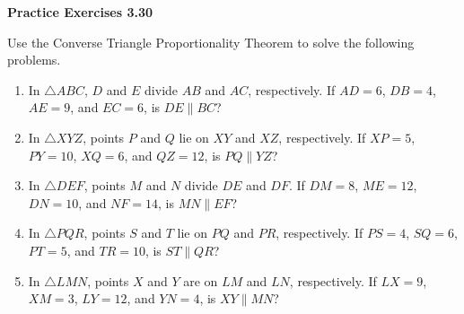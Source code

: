\vspace{0.3ex}
\noindent\textbf{Practice Exercises 3.30}

\vspace{0.2ex}

Use the Converse Triangle Proportionality Theorem to solve the following problems.

\begin{enumerate}[label=\color{blue}\arabic*.]
    \item In \(\triangle ABC\), \(D\) and \(E\) divide \(AB\) and \(AC\), respectively. If \(AD = 6\), \(DB = 4\), \(AE = 9\), and \(EC = 6\), is \(DE \parallel BC\)?
    \item In \(\triangle XYZ\), points \(P\) and \(Q\) lie on \(XY\) and \(XZ\), respectively. If \(XP = 5\), \(PY = 10\), \(XQ = 6\), and \(QZ = 12\), is \(PQ \parallel YZ\)?
    \item In \(\triangle DEF\), points \(M\) and \(N\) divide \(DE\) and \(DF\). If \(DM = 8\), \(ME = 12\), \(DN = 10\), and \(NF = 14\), is \(MN \parallel EF\)?
    \item In \(\triangle PQR\), points \(S\) and \(T\) lie on \(PQ\) and \(PR\), respectively. If \(PS = 4\), \(SQ = 6\), \(PT = 5\), and \(TR = 10\), is \(ST \parallel QR\)?
    \item In \(\triangle LMN\), points \(X\) and \(Y\) are on \(LM\) and \(LN\), respectively. If \(LX = 9\), \(XM = 3\), \(LY = 12\), and \(YN = 4\), is \(XY \parallel MN\)?
\end{enumerate}
